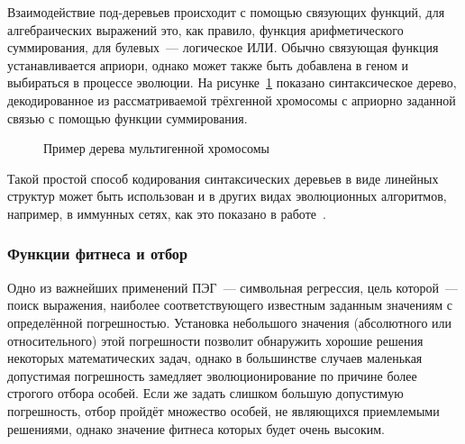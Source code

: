 Взаимодействие под-деревьев происходит с помощью связующих функций, для алгебраических выражений это, как правило, функция арифметического суммирования, для булевых~--- логическое ИЛИ. Обычно связующая функция устанавливается априори, однако может также быть добавлена в геном и выбираться в процессе эволюции. На рисунке~\ref{img:GEP_ET_sample_2} показано синтаксическое дерево, декодированное из рассматриваемой трёхгенной хромосомы с априорно заданной связью с помощью функции суммирования.

\begin{figure} [h]
  \center
  \caption{Пример дерева мультигенной хромосомы}
  \label{img:GEP_ET_sample_2}
\end{figure}

Такой простой способ кодирования синтаксических деревьев в виде линейных структур может быть использован и в других видах эволюционных алгоритмов, например, в иммунных сетях, как это показано в работе~\cite{karakasis2008efficient}.


\subsubsection{Функции фитнеса и отбор}

Одно из важнейших применений ПЭГ~--- символьная регрессия, цель которой~--- поиск выражения, наиболее соответствующего известным заданным значениям с определённой погрешностью. Установка небольшого значения (абсолютного или относительного) этой погрешности позволит обнаружить хорошие решения некоторых математических задач, однако в большинстве случаев маленькая допустимая погрешность замедляет эволюционирование по причине более строгого отбора особей. Если же задать слишком большую допустимую погрешность, отбор пройдёт множество особей, не являющихся приемлемыми решениями, однако значение фитнеса которых будет очень высоким.

